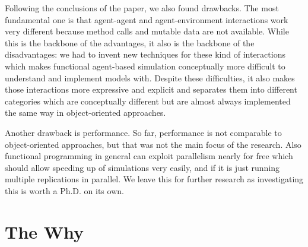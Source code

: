 Following the conclusions of the paper, we also found drawbacks. The most fundamental one is that agent-agent and agent-environment interactions work very different because method calls and mutable data are not available. While this is the backbone of the advantages, it also is the backbone of the disadvantages: we had to invent new techniques for these kind of interactions which makes functional agent-based simulation conceptually more difficult to understand and implement models with. Despite these difficulties, it also makes those interactions more expressive and explicit and separates them into different categories which are conceptually different but are almost always implemented the same way in object-oriented approaches.

Another drawback is performance. So far, performance is not comparable to object-oriented approaches, but that was not the main focus of the research. Also functional programming in general can exploit parallelism nearly for free which should allow speeding up of simulations very easily, and if it is just running multiple replications in parallel. We leave this for further research as investigating this is worth a Ph.D. on its own.

\section{The Why}

